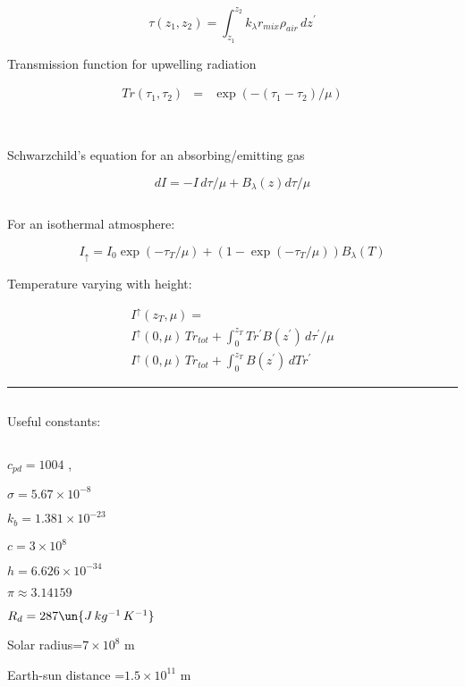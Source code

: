 \documentclass[12pt]{article}
\begin{document}
\begin{multicols}{2}
\begin{equation}
  \label{eq:tauup}
  \tau(z_1, z_2 ) = \int_{z_1}^{z_{2}} k_\lambda r_{mix} \rho_{air}\, dz^\prime
\end{equation}


\noindent
Transmission function for upwelling radiation

\begin{eqnarray}
Tr(\tau_1,\tau_2) &=& \exp ( - (\tau_1 - \tau_2)/\mu ) \nonumber\\
\end{eqnarray}

$~$


$~$

\noindent
Schwarzchild's equation for an absorbing/emitting gas

\begin{equation}
  \label{eq:schwarz}
  dI = -I\, d\tau/\mu + B_{\lambda}(z) d \tau /\mu
\end{equation}

$~$

\noindent
For an isothermal atmosphere:

\begin{equation}
\label{eq:isothermal}
I_\uparrow = I_0 \exp( - \tau_T /\mu) + (1 - \exp( - \tau_T /\mu)) B_\lambda(T)
\end{equation}


\noindent
Temperature varying with height:

\begin{gather}
  \label{eq:topa}
  I^\uparrow (z_T,\mu) = \nonumber \\
I^\uparrow (0,\mu) \, Tr_{tot} + \int_0^{z_T} Tr^\prime B(z^\prime)\, d\tau^\prime/\mu \label{eq:vary}\\
I^\uparrow (0,\mu) \, Tr_{tot} + \int_0^{z_T} B(z^\prime)\, dTr^\prime \label{eq:trans}
\end{gather}



\rule{3cm}{.1mm}



$~$

\noindent
Useful constants:

$~$

$c_{pd}=1004$ , 

$\sigma=5.67 \times  10^{-8}$ 

$k_b = 1.381  \times 10^{-23}$  

$c=3 \times 10^{8}$ 

$h=6.626 \times 10^{-34}$ 

$\pi \approx 3.14159$

$R_d=287 \un{J\,kg^{-1}\,K^{-1}}$

Solar radius=$7 \times 10^8$ m

Earth-sun distance =$1.5 \times 10^{11}$ m

\end{multicols}
\end{document}
